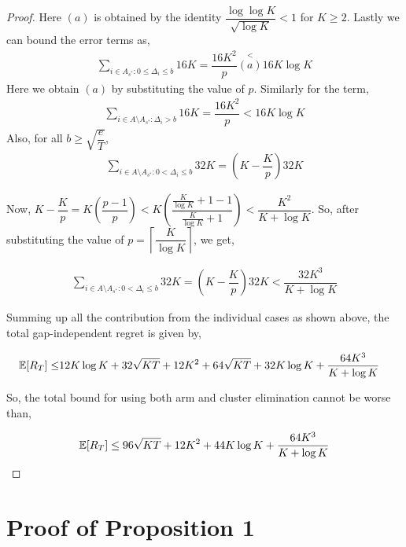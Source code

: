 \begin{proof}
	Here $(a)$ is obtained by the identity $\dfrac{\log\log K}{\sqrt{\log K}} < 1$ for $K\geq 2$. Lastly we can bound the error terms as, 
	\begin{align*}
	\sum\limits_{i\in A_{s^{*}}:0\leq\Delta_{i}\leq b} 16K =\dfrac{16K^2}{p} \overset{<}{(a)} 16K\log K
	\end{align*}	 	
 	Here we obtain $(a)$ by substituting the value of $p$. Similarly for the term,
 	\begin{align*}
 	\sum_{i\in A\setminus A_{s^*}: \Delta_{i} > b} 16K =\dfrac{16K^2}{p} < 16K\log K
	\end{align*} 	
	Also, for all $b\geq \sqrt{\dfrac{e}{T}}$,
	\begin{align*}
 	\sum_{i\in A\setminus A_{s^*}: 0 < \Delta_{i} \leq b} 32K = \left(K-\dfrac{K}{p}\right) 32K
	\end{align*} 	
	
	Now, $K-\dfrac{K}{p}= K\left( \dfrac{p-1}{p} \right) < K\left(  \dfrac{\frac{K}{\log K}+1-1}{\frac{K}{\log K}+1 }\right) < \dfrac{K^2}{K+\log K}$. So, after substituting the value of $p=\left\lceil \dfrac{K}{\log K} \right\rceil$, we get,
	
	\begin{align*}
 	\sum_{i\in A\setminus A_{s^*}: 0 < \Delta_{i} \leq b} 32K = \left(K-\dfrac{K}{p}\right)32K < \dfrac{32 K^3}{K+\log K}
	\end{align*} 	
	
	Summing up all the contribution from the individual cases as shown above, the total gap-independent regret is given by,	
	
	\begin{align*}
	\mathbb{E}[R_{T}]\leq & 12K\log K + 32\sqrt{KT} + 12K^2 + 64\sqrt{KT} + 32K\log K + \dfrac{64 K^3}{K+\log K}
	\end{align*}
 	
	So, the total bound for using both arm and cluster elimination cannot be worse than,
	
	\begin{align*}
	\mathbb{E}[R_{T}]\leq 96\sqrt{KT} + 12K^2 + 44K\log K + \dfrac{64 K^3}{K+\log K}\\ 
	\end{align*}		
\end{proof}


\section{Proof of Proposition 1}
\label{App:A}

